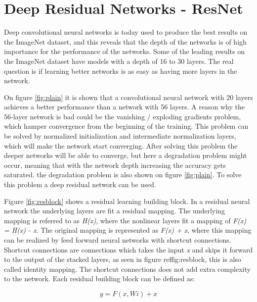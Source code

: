 \section{Deep Residual Networks - ResNet}

Deep convolutional neural networks is today used to produce the best results on the ImageNet dataset, and this reveals that the depth of the networks is of high importance for the performance of the networks\citep{RESNET}. Some of the leading results on the ImageNet dataset have models with a depth of 16 to 30 layers. The real question is if learning better networks is as easy as having more layers in the network.


On figure \ref{fig:plain} it is shown that a convolutional neural network with 20 layers achieves a better performance than a network with 56 layers. A reason why the 56-layer network is bad could be the vanishing / exploding gradients problem, which hamper convergence from the beginning of the training. This problem can be solved by normalized initialization and intermediate normalization layers, which will make the network start converging. After solving this problem the deeper networks will be able to converge, but here a degradation problem might occur, meaning that with the network depth increasing the accuracy gets saturated. the degradation problem is also shown on figure \ref{fig:plain}. To solve this problem a deep residual network can be used.


Figure \ref{fig:resblock} shows a residual learning building block. In a residual neural network the underlying layers are fit a residual mapping. The underlying mapping is referred to as \emph{H(x)}, where the nonlinear layers fit a mapping of \emph{F(x) = H(x) - x}. The original mapping is represented as \emph{F(x) + x}, where this mapping can be realized by feed forward neural networks with shortcut connections. Shortcut connections are connections which takes the input \emph{x} and skips it forward to the output of the stacked layers, as seen in figure ref{fig:resblock}, this is also called identity mapping. The shortcut connections does not add extra complexity to the network. Each residual building block can be defined as:

\begin{equation} \label{eq:res}
y = F(x, {Wi}) + x
\end{equation} 

